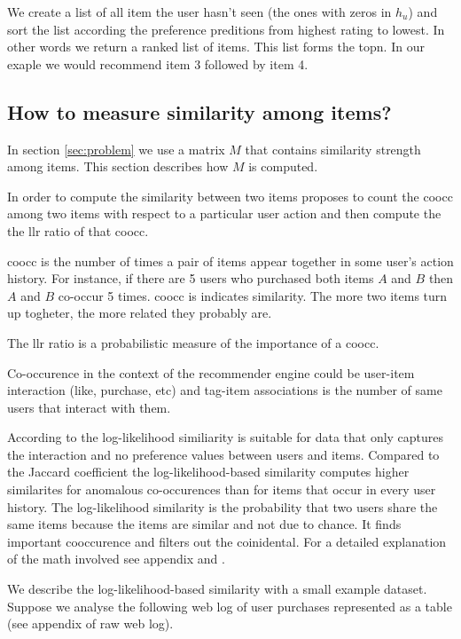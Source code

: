 We create a list of all item the user hasn't seen (the ones with zeros in $h_u$) and sort the list according the preference preditions from highest rating to lowest. In other words we return a ranked list of items. This list forms the \gls{topn}. In our exaple we would recommend item 3 followed by item 4.

\subsection{How to measure similarity among items?}
\label{sec:llr}

In section \ref{sec:problem} we use a matrix $M$ that contains similarity strength among items. This section describes how $M$ is computed.

In order to compute the similarity between two items \cite{Dunning14} proposes to count the \gls{coocc} among two items with respect to a particular user action and then compute the the \gls{llr} ratio of that \gls{coocc}.

\gls{coocc} is the number of times a pair of items appear together in some user's action history. For instance, if there are 5 users who purchased both items $A$ and $B$ then $A$ and $B$ co-occur 5 times. \gls{coocc} is indicates similarity. The more two items turn up togheter, the more related they probably are.

The \gls{llr} ratio is a probabilistic measure of the importance of a \gls{coocc}. 

Co-occurence in the context of the recommender engine could be user-item interaction (like, purchase, etc) and tag-item associations is the number of same users that interact with them.

According to \cite{Dunning93} the log-likelihood similiarity is suitable for data that only captures the interaction and no preference values between users and items. 
Compared to the Jaccard coefficient \cite{Hartung} the log-likelihood-based similarity computes higher similarites for anomalous co-occurences than for items that occur in every user history. The log-likelihood similarity  is the probability that two users share the same items because the items are similar and not due to chance. It finds important cooccurence and filters out the coinidental. For a detailed explanation of the math involved see appendix and \cite{Dunning93}. 

We describe the log-likelihood-based similarity with a small example dataset. Suppose we analyse the following web log of user purchases represented as a table (see appendix of raw web log).

